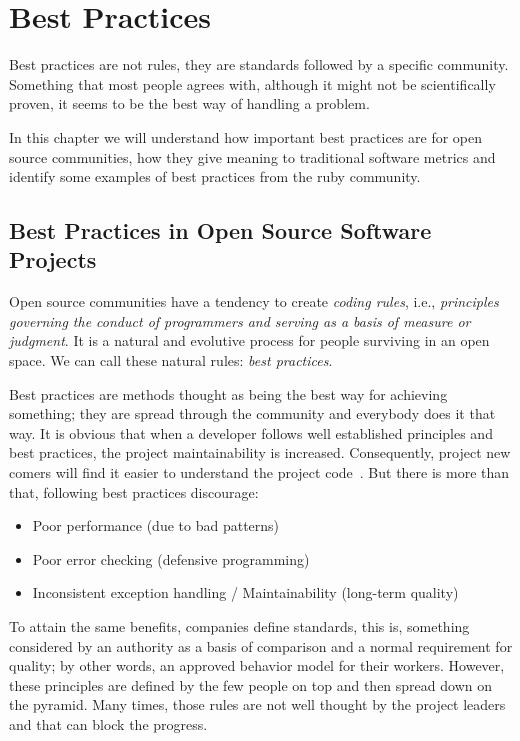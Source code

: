 \thispagestyle{empty}
\chapter{Best Practices}\label{chap:best_practices}

Best practices are not rules, they are standards followed by a specific community.
Something that most people agrees with, although it might not be scientifically proven,
it seems to be the best way of handling a problem.

In this chapter we will understand how important best practices are for open source communities, 
how they give meaning to traditional software metrics
and identify some examples of best practices from the ruby community.


\section{Best Practices in Open Source Software Projects} \label{sec:best_practices_ossp}
Open source communities have a tendency to create \emph{coding rules},
i.e., \emph{principles governing the conduct of programmers and serving as a basis of measure or judgment}. 
It is a natural and evolutive process for people surviving in an open space.
We can call these natural rules: \emph{best practices}.

Best practices are  methods thought as being the  best way for achieving something;
they are spread through the community and everybody does it that way.
It is obvious that when a developer follows well established principles and best practices, 
the project maintainability is increased.
Consequently, project new comers will find it easier to understand the project code~\cite{dromey2002model}.
But there is more than that, following best practices discourage:
\begin{itemize}
\item Poor performance (due to bad patterns)
\item Poor error checking (defensive programming)
\item Inconsistent exception handling / Maintainability (long-term quality)
\end{itemize}

To attain the same benefits, companies define standards, this is, something considered by an authority 
as a basis of comparison and a normal requirement for quality;
by other words, an approved behavior model for their workers.
However, these principles are defined by the few people on top and then spread down on the pyramid.
Many times, those rules are not well thought by the project leaders and that can block the progress.

